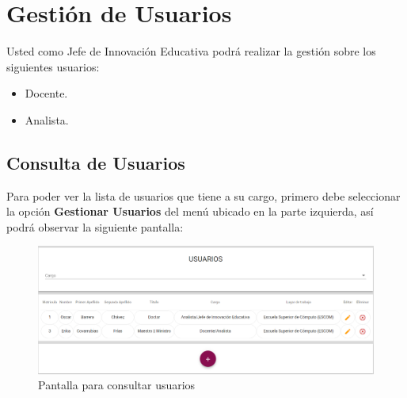 
\section{Gestión de Usuarios}

    Usted como Jefe de Innovación Educativa podrá realizar la gestión sobre los siguientes usuarios:
    \begin{itemize}
        \item Docente.
        \item Analista.
    \end{itemize}


    \subsection{Consulta de Usuarios}

        Para poder ver la lista de usuarios que tiene a su cargo, primero debe seleccionar la opción \textbf{Gestionar Usuarios} del menú ubicado en la parte izquierda, así podrá observar la siguiente pantalla:

        \begin{figure}[H]
            \centering
            \hypertarget{consultarUs}{\includegraphics[width=0.7\linewidth]{images/SP5/Consultar-Usuario}}
            \caption{Pantalla para consultar usuarios}
            \label{consultarrh}
        \end{figure}

